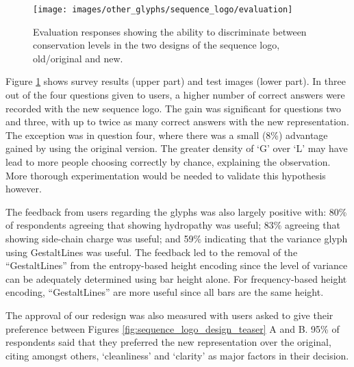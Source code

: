 \begin{figure}[t!]
\centering
\texttt{[image: images/other\_glyphs/sequence\_logo/evaluation]}
\caption{Evaluation responses showing the ability to discriminate between conservation levels in the two designs of the sequence logo, old/original and new.}
\label{fig:evaluation}
\end{figure}

Figure \ref{fig:evaluation} shows survey results (upper part) and test images (lower part).
In three out of the four questions given to users, a higher number of correct answers were recorded with the new sequence logo.
The gain was significant for questions two and three, with up to twice as many correct answers with the new representation. The exception was in question four, where there was a small (8\%) advantage gained by using the original version.
The greater density of `G' over `L' may have lead to more people choosing correctly by chance, explaining the observation. More thorough experimentation would be needed to validate this hypothesis however.

The feedback from users regarding the glyphs was also largely positive with: 80\% of respondents agreeing that showing hydropathy was useful; 83\% agreeing that showing side-chain charge was useful; and 59\% indicating that the variance glyph using GestaltLines was useful.
The feedback led to the removal of the ``GestaltLines'' from the entropy-based height encoding since the level of variance can be adequately determined using bar height alone.
For frequency-based height encoding, ``GestaltLines'' are more useful since all bars are the same height.

The approval of our redesign was also measured with users asked to give their preference between Figures \ref{fig:sequence_logo_design_teaser} A and B. 95\% of respondents said that they preferred the new representation over the original, citing amongst others, `cleanliness' and `clarity' as major factors in their decision.
%
%

